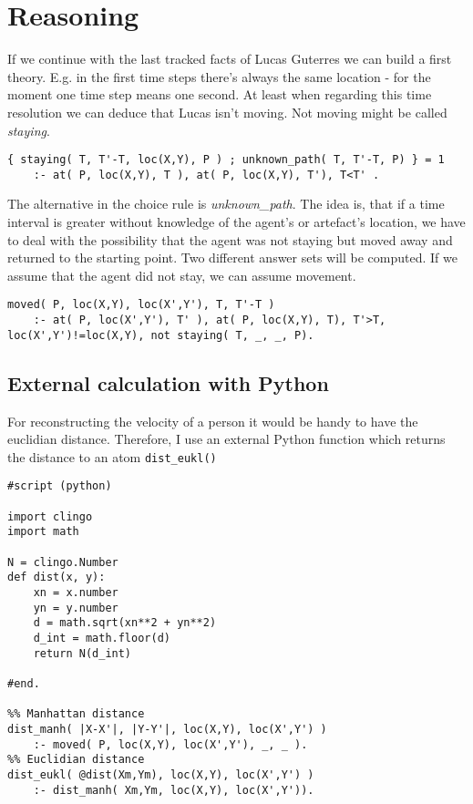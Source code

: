 \documentclass[11pt,a4paper]{article}
\begin{document}
\section{Reasoning}
If we continue with the last tracked facts of Lucas Guterres we can build a first theory. E.g. in the first time steps there's always the same location - for the moment one time step means one second. At least when regarding this time resolution we can deduce that Lucas isn't moving.
Not moving might be called \textit{staying}.
\begin{lstlisting}[breaklines=true, numbers=none]
{ staying( T, T'-T, loc(X,Y), P ) ; unknown_path( T, T'-T, P) } = 1 
	:- at( P, loc(X,Y), T ), at( P, loc(X,Y), T'), T<T' .
\end{lstlisting}
The alternative in the choice rule is \textit{unknown\_path}. The idea is, that if a time interval is greater without knowledge of the agent's or artefact's location, we have to deal with the possibility that the agent was not staying but moved away and returned to the starting point.
Two different answer sets will be computed. 
If we assume that the agent did not stay, we can assume movement.
\begin{lstlisting}[breaklines=true, numbers=none]
moved( P, loc(X,Y), loc(X',Y'), T, T'-T ) 
	:- at( P, loc(X',Y'), T' ), at( P, loc(X,Y), T), T'>T, loc(X',Y')!=loc(X,Y), not staying( T, _, _, P).
\end{lstlisting}
\subsection{External calculation with Python}
For reconstructing the velocity of a person it would be handy to have the euclidian distance. Therefore, I use an external Python function which returns the distance to an atom \texttt{dist\_eukl()}

\begin{lstlisting}
#script (python)

import clingo
import math

N = clingo.Number
def dist(x, y):
    xn = x.number
    yn = y.number
    d = math.sqrt(xn**2 + yn**2)
    d_int = math.floor(d)
    return N(d_int)

#end.

%% Manhattan distance
dist_manh( |X-X'|, |Y-Y'|, loc(X,Y), loc(X',Y') )   
	:- moved( P, loc(X,Y), loc(X',Y'), _, _ ).
%% Euclidian distance	      
dist_eukl( @dist(Xm,Ym), loc(X,Y), loc(X',Y') )    
	:- dist_manh( Xm,Ym, loc(X,Y), loc(X',Y')).    
\end{lstlisting}
\end{document}
